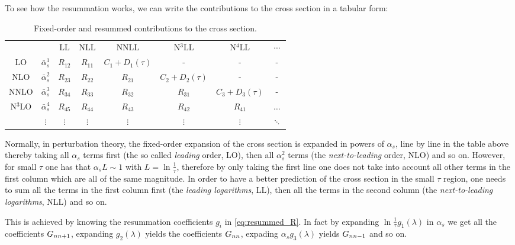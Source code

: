 \documentclass[../main.tex]{subfiles}
\begin{document}
To see how the resummation works, we can write the contributions to the cross section in a tabular form:

\begin{table}[h]
    \centering
    \caption{Fixed-order and resummed contributions to the cross section.}

    \begin{tabular}{c c c c c c c c}
        &&\(\text{LL}\) & \(\text{NLL}\) &\(\text{NNLL}\) & \(\text{N$^3$LL}\) & \(\text{N$^4$LL}\) & \(\cdots\)\\
        \(\text{LO}\)&\(\bar{\alpha}_s^1\) &\(R_{12}\) & \(R_{11}\) & \(C_1+D_1(\tau)\) & -  & - &  - \\
        \(\text{NLO}\)&\(\bar{\alpha}_s^2\) & \(R_{23}\) & \(R_{22}\) & \(R_{21}\) & \(C_2 + D_2(\tau)\) & - & -  \\
        \(\text{NNLO}\)&\(\bar{\alpha}_s^3\) & \(R_{34}\) & \(R_{33}\) & \(R_{32}\) & \(R_{31}\) & \(C_3 + D_3(\tau)\) & -  \\
        \(\text{N$^3$LO}\)&\(\bar{\alpha}_s^4\) & \(R_{45}\) & \(R_{44}\) & \(R_{43}\) & \(R_{42}\) & \(R_{41}\) & \(\dots\) \\
        & \(\vdots\) & \(\vdots\) & \(\vdots\) & \(\vdots\) & \(\vdots\) & \(\vdots\) & \(\ddots\) 
    \end{tabular}
      
\end{table}

Normally, in perturbation theory, the fixed-order expansion of the cross section is expanded in powers of $\alpha_s$, 
line by line in the table above thereby taking all $\alpha_s$ terms first (the so called \emph{leading} order, LO), then all $\alpha_s^2$ terms (the \emph{next-to-leading} order, NLO) and so on.
However, for small $\tau$ one has that $\alpha_s L\sim 1$ with $L = \ln \frac{1}{\tau}$, therefore by only taking the first line one does not
take into account all other terms in the first column which are all of the same magnitude. 
In order to have a better prediction of the cross section in the small $\tau$ region, one needs to sum all the terms in the first column first (the \emph{leading logarithms}, LL),
then all the terms in the second column (the \emph{next-to-leading logarithms}, NLL) and so on.


This is achieved by knowing the resummation coefficients $g_i$ in \cref{eq:resummed_R}. In fact by expanding $\ln\frac{1}{\tau} g_1(\lambda)$ in $\alpha_s$ we get all the coefficients $G_{n\space n+1}$, expanding
$g_2(\lambda)$ yields the coefficients $G_{n\space n}$, expading $\alpha_s g_3(\lambda) $ yields $G_{n \space n-1}$ and so on.
\end{document}
